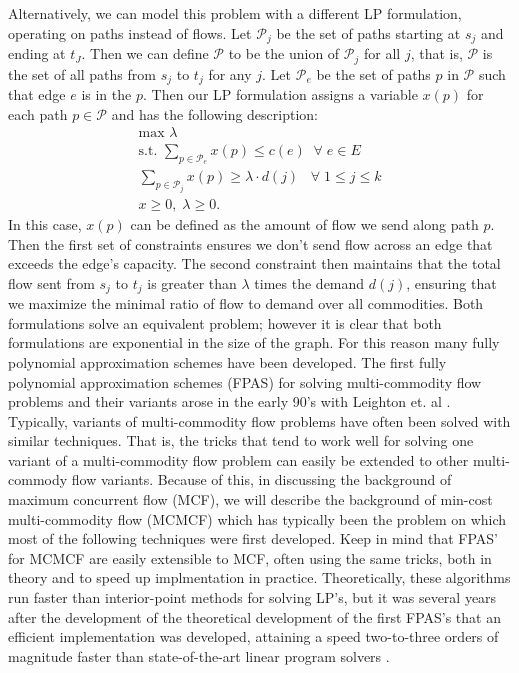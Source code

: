 Alternatively, we can model this problem with a
different LP formulation, operating on paths instead of flows. Let
$\mathcal{P}_j$ be the set of paths starting at $s_j$ and ending at
$t_J$.
Then we can define $\mathcal{P}$ to be the union of $\mathcal{P}_j$
for all $j$, that is, $\mathcal{P}$ is the set of all paths from $s_j$
to $t_j$ for any $j$. Let $\mathcal{P}_e$ be the set of paths $p$ in
$\mathcal{P}$ such that edge $e$ is in the $p$. Then our LP
formulation assigns a variable $x(p)$ for each path $p\in \mathcal{P}$
and has the following description:
\begin{align*}
\text{max     } \lambda \\
\text{s.t. }\sum_{p\in \mathcal{P}_e}x(p) \leq c(e) \;\;\forall\;
e\in E \\
\sum_{p\in \mathcal{P}_j} x(p)\geq \lambda\cdot d(j) \;\;\;\forall \;1\leq j\leq k \\
x\geq 0,\; \lambda\geq 0.
\end{align*}
In this case, $x(p)$ can be defined as the amount of flow we send
along path $p$. Then the first set of constraints ensures we don't
send flow across an edge that exceeds the edge's capacity. The second
constraint then maintains that the total flow sent from $s_j$ to $t_j$
is greater than $\lambda$ times the demand $d(j)$, ensuring that we
maximize the minimal ratio of flow to demand over all commodities. Both formulations solve an equivalent problem; however
it is clear that both formulations are exponential in the size of the graph. For this
reason many fully polynomial approximation schemes have been
developed. 
The first fully polynomial approximation schemes (FPAS) for solving
multi-commodity flow problems and their variants arose in the early
90's with Leighton et. al \cite{leighton}.
Typically, variants of multi-commodity flow problems have often been
solved with similar techniques. That is, the tricks that tend to work
well for solving one variant of a multi-commodity flow problem can
easily be extended to other multi-commody flow variants. Because of this, in discussing the background of maximum concurrent flow (MCF),
we will describe the background of min-cost multi-commodity flow
(MCMCF) which has typically been the problem on which most of the
following techniques were first developed. Keep in mind that FPAS'
for MCMCF are easily extensible to MCF, often using the same tricks,
both in theory and to speed up implmentation in
practice.
Theoretically, these algorithms run faster than
interior-point methods for solving LP's, but it was several years
after the development of the theoretical development of
the first FPAS's that an efficient implementation was developed,
attaining a speed two-to-three orders of magnitude faster than
state-of-the-art linear program solvers \cite{goldberg}.

